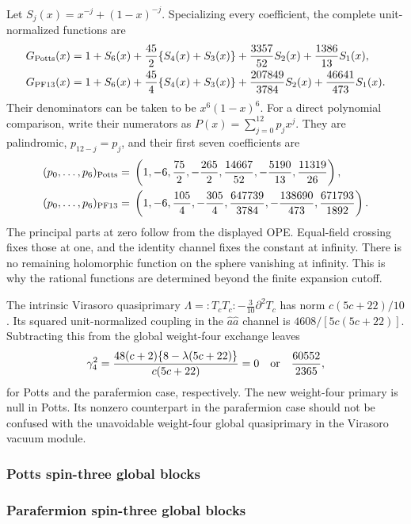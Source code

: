 Let $S_j(x)=x^{-j}+(1-x)^{-j}$. Specializing every coefficient,
the complete unit-normalized functions are
\begin{align}
 G_{\rm Potts}(x)={}&1+S_6(x)
 +\frac{45}{2}\{S_4(x)+S_3(x)\}
 +\frac{3357}{52}S_2(x)+\frac{1386}{13}S_1(x),\\
 G_{\rm PF13}(x)={}&1+S_6(x)
 +\frac{45}{4}\{S_4(x)+S_3(x)\}
 +\frac{207849}{3784}S_2(x)+\frac{46641}{473}S_1(x).
 \label{expphysics:spin3-specialized}
\end{align}
Their denominators can be taken to be $x^6(1-x)^6$.
For a direct polynomial comparison, write their numerators as
$P(x)=\sum_{j=0}^{12}p_jx^j$. They are palindromic,
$p_{12-j}=p_j$, and their first seven coefficients are
\begin{align*}
 (p_0,\ldots,p_6)_{\rm Potts}={}&
 \left(1,-6,\frac{75}{2},-\frac{265}{2},\frac{14667}{52},
 -\frac{5190}{13},\frac{11319}{26}\right),\\
 (p_0,\ldots,p_6)_{\rm PF13}={}&
 \left(1,-6,\frac{105}{4},-\frac{305}{4},\frac{647739}{3784},
 -\frac{138690}{473},\frac{671793}{1892}\right).
\end{align*}
The principal parts at zero follow from the displayed OPE. Equal-field
crossing fixes those at one, and the identity channel fixes the
constant at infinity. There is no remaining holomorphic function on
the sphere vanishing at infinity. This is why the rational functions
are determined beyond the finite expansion cutoff.

The intrinsic Virasoro quasiprimary
$\Lambda=:T_cT_c:-\tfrac3{10}\partial^2T_c$ has norm
$c(5c+22)/10$. Its squared unit-normalized coupling in the
$\widehat a\widehat a$ channel is $4608/[5c(5c+22)]$.
Subtracting this from the global weight-four exchange leaves
\[
 \gamma_4^2=
 \frac{48(c+2)\{8-\lambda(5c+22)\}}{c(5c+22)}
 =0\quad\hbox{or}\quad\frac{60552}{2365},
\]
for Potts and the parafermion case, respectively. The new
weight-four primary is null in Potts. Its nonzero counterpart in
the parafermion case should not be confused with the unavoidable
weight-four global quasiprimary in the Virasoro vacuum module.

\subsubsection{Potts spin-three global blocks}

\subsubsection{Parafermion spin-three global blocks}


